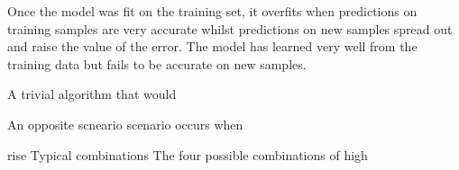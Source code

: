  Once the model was fit on the training set, it overfits when predictions on training samples are very accurate whilst predictions on new samples spread out and raise the value of the error. The model has learned very well from the training data but fails to be accurate on new samples.
 
 A trivial algorithm that would 
 
 An opposite scneario scenario occurs when
 
 
 rise Typical combinations
 The four possible combinations of high 
 

